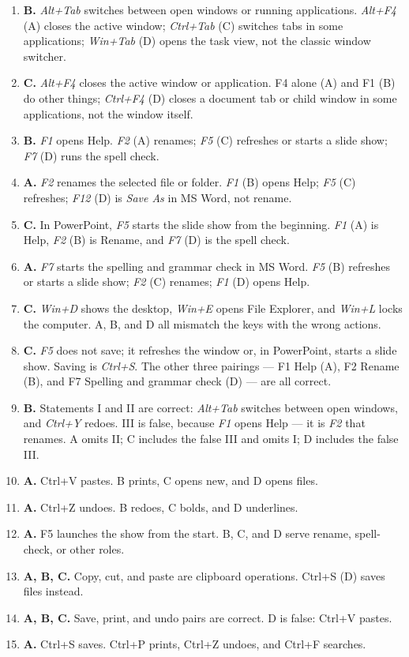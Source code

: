 \begin{enumerate}[label=\textbf{Q\arabic*.}, leftmargin=*]
\item \textbf{B.} \textit{Alt+Tab} switches between open windows or running
  applications. \textit{Alt+F4} (A) closes the active window; \textit{Ctrl+Tab}
  (C) switches tabs in some applications; \textit{Win+Tab} (D) opens the task
  view, not the classic window switcher.
\item \textbf{C.} \textit{Alt+F4} closes the active window or application. F4
  alone (A) and F1 (B) do other things; \textit{Ctrl+F4} (D) closes a document
  tab or child window in some applications, not the window itself.
\item \textbf{B.} \textit{F1} opens Help. \textit{F2} (A) renames; \textit{F5}
  (C) refreshes or starts a slide show; \textit{F7} (D) runs the spell check.
\item \textbf{A.} \textit{F2} renames the selected file or folder. \textit{F1}
  (B) opens Help; \textit{F5} (C) refreshes; \textit{F12} (D) is
  \textit{Save As} in MS Word, not rename.
\item \textbf{C.} In PowerPoint, \textit{F5} starts the slide show from the
  beginning. \textit{F1} (A) is Help, \textit{F2} (B) is Rename, and \textit{F7}
  (D) is the spell check.
\item \textbf{A.} \textit{F7} starts the spelling and grammar check in MS Word.
  \textit{F5} (B) refreshes or starts a slide show; \textit{F2} (C) renames;
  \textit{F1} (D) opens Help.
\item \textbf{C.} \textit{Win+D} shows the desktop, \textit{Win+E} opens File
  Explorer, and \textit{Win+L} locks the computer. A, B, and D all mismatch the
  keys with the wrong actions.
\item \textbf{C.} \textit{F5} does not save; it refreshes the window or, in
  PowerPoint, starts a slide show. Saving is \textit{Ctrl+S}. The other three
  pairings --- F1 Help (A), F2 Rename (B), and F7 Spelling and grammar check
  (D) --- are all correct.
\item \textbf{B.} Statements I and II are correct: \textit{Alt+Tab} switches
  between open windows, and \textit{Ctrl+Y} redoes. III is false, because
  \textit{F1} opens Help --- it is \textit{F2} that renames. A omits II; C
  includes the false III and omits I; D includes the false III.

\item \textbf{A.} Ctrl+V pastes. B prints, C opens new, and D opens files.
\item \textbf{A.} Ctrl+Z undoes. B redoes, C bolds, and D underlines.
\item \textbf{A.} F5 launches the show from the start. B, C, and D serve rename, spell-check, or other roles.
\item \textbf{A, B, C.} Copy, cut, and paste are clipboard operations. Ctrl+S (D) saves files instead.
\item \textbf{A, B, C.} Save, print, and undo pairs are correct. D is false: Ctrl+V pastes.
\item \textbf{A.} Ctrl+S saves. Ctrl+P prints, Ctrl+Z undoes, and Ctrl+F searches.


\end{enumerate}
